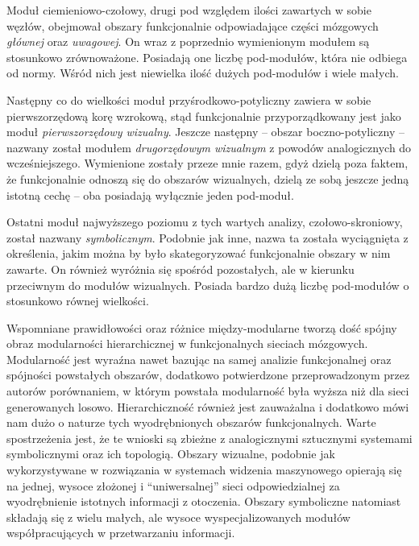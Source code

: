 Moduł ciemieniowo-czołowy, drugi pod względem ilości zawartych w sobie węzłów, obejmował obszary funkcjonalnie odpowiadające części mózgowych \emph{głównej} oraz \emph{uwagowej}.
On wraz z poprzednio wymienionym modułem są stosunkowo zrównoważone.
Posiadają one liczbę pod-modułów, która nie odbiega od normy.
Wśród nich jest niewielka ilość dużych pod-modułów i wiele małych.

Następny co do wielkości moduł przyśrodkowo-potyliczny zawiera w sobie pierwszorzędową korę wzrokową, stąd funkcjonalnie przyporządkowany jest jako moduł \emph{pierwszorzędowy wizualny}.
Jeszcze następny -- obszar boczno-potyliczny -- nazwany został modułem \emph{drugorzędowym wizualnym} z powodów analogicznych do wcześniejszego.
Wymienione zostały przeze mnie razem, gdyż dzielą poza faktem, że funkcjonalnie odnoszą się do obszarów wizualnych, dzielą ze sobą jeszcze jedną istotną cechę -- oba posiadają wyłącznie jeden pod-moduł.

Ostatni moduł najwyższego poziomu z tych wartych analizy, czołowo-skroniowy, został nazwany \emph{symbolicznym}.
Podobnie jak inne, nazwa ta została wyciągnięta z określenia, jakim można by było skategoryzować funkcjonalnie obszary w nim zawarte.
On również wyróżnia się spośród pozostałych, ale w kierunku przeciwnym do modułów wizualnych.
Posiada bardzo dużą liczbę pod-modułów o stosunkowo równej wielkości.

Wspomniane prawidłowości oraz różnice między-modularne tworzą dość spójny obraz modularności hierarchicznej w funkcjonalnych sieciach mózgowych.
Modularność jest wyraźna nawet bazując na samej analizie funkcjonalnej oraz spójności powstałych obszarów, dodatkowo potwierdzone przeprowadzonym przez autorów porównaniem, w którym powstała modularność była wyższa niż dla sieci generowanych losowo.
Hierarchiczność również jest zauważalna i dodatkowo mówi nam dużo o naturze tych wyodrębnionych obszarów funkcjonalnych.
Warte spostrzeżenia jest, że te wnioski są zbieżne z analogicznymi sztucznymi systemami symbolicznymi oraz ich topologią.
Obszary wizualne, podobnie jak wykorzystywane w rozwiązania w systemach widzenia maszynowego opierają się na jednej, wysoce złożonej i ``uniwersalnej'' sieci odpowiedzialnej za wyodrębnienie istotnych informacji z otoczenia.
Obszary symboliczne natomiast składają się z wielu małych, ale wysoce wyspecjalizowanych modułów współpracujących w przetwarzaniu informacji.
